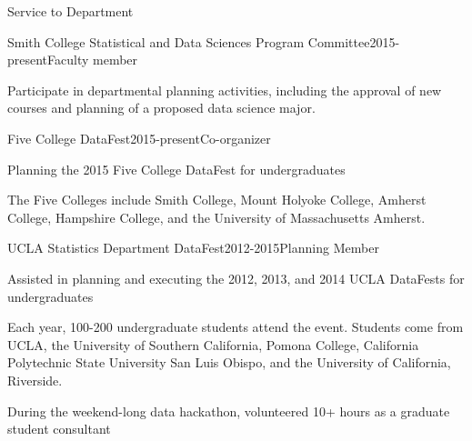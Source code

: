 \documentclass{resume} %
\begin{document}
\begin{rSection}{Service to Department}
\begin{rSubsection}{Smith College Statistical and Data Sciences Program Committee}{}{2015-present}{Faculty member}
\item Participate in departmental planning activities, including the approval of new courses and planning of a proposed data science major. 
\end{rSubsection}

\begin{rSubsection}{Five College DataFest}{}{2015-present}{Co-organizer}
\item Planning the 2015 Five College DataFest for undergraduates
\item The Five Colleges include Smith College, Mount Holyoke College, Amherst College, Hampshire College, and the University of Massachusetts Amherst. 
\end{rSubsection}

\begin{rSubsection}{UCLA Statistics Department DataFest}{}{2012-2015}{Planning Member}
\item Assisted in planning and executing the 2012, 2013, and 2014 UCLA DataFests for undergraduates
\item Each year, 100-200 undergraduate students attend the event. Students come from UCLA, the University of Southern California, Pomona College, California Polytechnic State University San Luis Obispo, and the University of California, Riverside. 
\item During the weekend-long data hackathon, volunteered 10+ hours as a graduate student consultant
\end{rSubsection}
\end{rSection}
\end{document}
